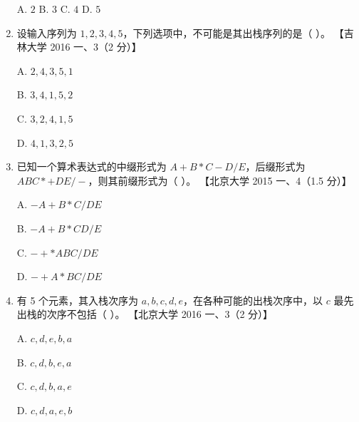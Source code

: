 \documentclass[lang=cn,newtx,10pt,scheme=chinese]{../../elegantbook}
\begin{document}
\begin{enumerate}
    A. $2$ \quad B. $3$ \quad C. $4$ \quad D. $5$  

    \item 设输入序列为 $1, 2, 3, 4, 5$，下列选项中，不可能是其出栈序列的是（ ）。  
    【吉林大学 2016 一、3（2 分）】  

    A. $2, 4, 3, 5, 1$  

    B. $3, 4,1,5,2$  

    C. $3, 2, 4, 1, 5$  

    D. $4,1,3,2,5$  

    \item 已知一个算术表达式的中缀形式为 $A + B * C - D / E$，后缀形式为 $A B C * + D E / -$，则其前缀形式为（ ）。  
    【北京大学 2015 一、4（1.5 分）】  

    A. $-A+B*C/DE$  

    B. $-A+B*CD/E$  

    C. $-+*ABC/DE$  

    D. $-+A*BC/DE$  

    \item 有 5 个元素，其入栈次序为 $a, b, c, d, e$，在各种可能的出栈次序中，以 $c$ 最先出栈的次序不包括（ ）。  
    【北京大学 2016 一、3（2 分）】  

    A. $c, d, e, b, a$  

    B. $c, d, b, e, a$  

    C. $c, d, b, a, e$  

    D. $c, d, a, e, b$  
\end{enumerate}
\end{document}
